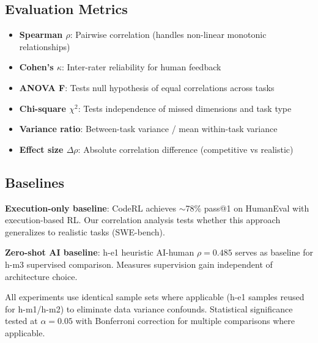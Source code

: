 \subsection{Evaluation Metrics}

\begin{itemize}
\item \textbf{Spearman $\rho$}: Pairwise correlation (handles non-linear monotonic relationships)
\item \textbf{Cohen's $\kappa$}: Inter-rater reliability for human feedback
\item \textbf{ANOVA F}: Tests null hypothesis of equal correlations across tasks
\item \textbf{Chi-square $\chi^2$}: Tests independence of missed dimensions and task type
\item \textbf{Variance ratio}: Between-task variance / mean within-task variance
\item \textbf{Effect size $\Delta\rho$}: Absolute correlation difference (competitive vs realistic)
\end{itemize}

\subsection{Baselines}

\textbf{Execution-only baseline}: CodeRL \cite{le2022coderl} achieves $\sim$78\% pass@1 on HumanEval with execution-based RL. Our correlation analysis tests whether this approach generalizes to realistic tasks (SWE-bench).

\textbf{Zero-shot AI baseline}: h-e1 heuristic AI-human $\rho=0.485$ serves as baseline for h-m3 supervised comparison. Measures supervision gain independent of architecture choice.

All experiments use identical sample sets where applicable (h-e1 samples reused for h-m1/h-m2) to eliminate data variance confounds. Statistical significance tested at $\alpha=0.05$ with Bonferroni correction for multiple comparisons where applicable.
